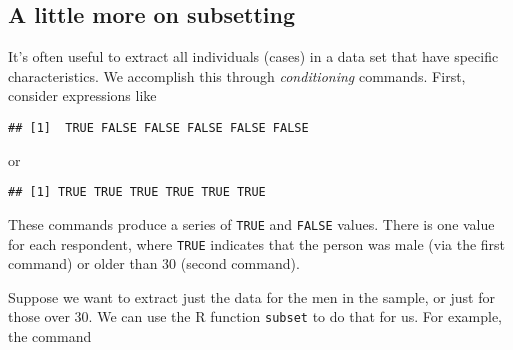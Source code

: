 \documentclass[]{article}
\newenvironment{Shaded}{\begin{snugshade}}{\end{snugshade}}
\newcommand{\KeywordTok}[1]{\textcolor[rgb]{0.13,0.29,0.53}{\textbf{#1}}}
\newcommand{\DecValTok}[1]{\textcolor[rgb]{0.00,0.00,0.81}{#1}}
\newcommand{\StringTok}[1]{\textcolor[rgb]{0.31,0.60,0.02}{#1}}
\newcommand{\OperatorTok}[1]{\textcolor[rgb]{0.81,0.36,0.00}{\textbf{#1}}}
\newcommand{\NormalTok}[1]{#1}
\begin{document}
\subsection{A little more on
subsetting}\label{a-little-more-on-subsetting}

It's often useful to extract all individuals (cases) in a data set that
have specific characteristics. We accomplish this through
\emph{conditioning} commands. First, consider expressions like

\begin{Shaded}
\end{Shaded}

\begin{verbatim}
## [1]  TRUE FALSE FALSE FALSE FALSE FALSE
\end{verbatim}

or

\begin{Shaded}
\end{Shaded}

\begin{verbatim}
## [1] TRUE TRUE TRUE TRUE TRUE TRUE
\end{verbatim}

These commands produce a series of \texttt{TRUE} and \texttt{FALSE}
values. There is one value for each respondent, where \texttt{TRUE}
indicates that the person was male (via the first command) or older than
30 (second command).

Suppose we want to extract just the data for the men in the sample, or
just for those over 30. We can use the R function \texttt{subset} to do
that for us. For example, the command

\begin{Shaded}
\end{Shaded}
\end{document}
